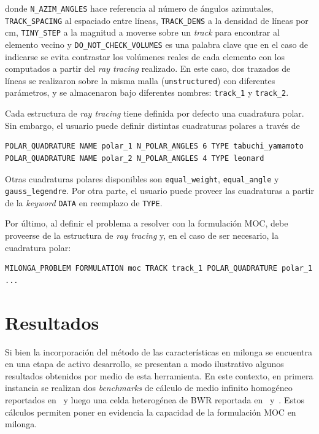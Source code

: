 \documentclass[11pt]{article}
\numberwithin{equation}{section}
\begin{document}
\noindent
donde \texttt{N_AZIM_ANGLES} hace referencia al n\'umero de \'angulos azimutales, \texttt{TRACK_SPACING} al espaciado entre l\'ineas, \texttt{TRACK_DENS} a la densidad de l\'ineas por \si{\centi\metre}, \texttt{TINY_STEP} a la magnitud a moverse sobre un \emph{track} para encontrar al elemento vecino y \texttt{DO_NOT_CHECK_VOLUMES} es una palabra clave que en el caso de indicarse se evita contrastar los volúmenes reales de cada elemento con los computados a partir del \emph{ray tracing} realizado. En este caso, dos trazados de l\'ineas se realizaron sobre la misma malla (\texttt{unstructured}) con diferentes par\'ametros, y se almacenaron bajo diferentes nombres: \texttt{track_1} y \texttt{track_2}.

Cada estructura de \emph{ray tracing} tiene definida por defecto una cuadratura polar. Sin embargo, el usuario puede definir distintas cuadraturas polares a trav\'es de

\begin{lstlisting}[style=wasora]
POLAR_QUADRATURE NAME polar_1 N_POLAR_ANGLES 6 TYPE tabuchi_yamamoto
POLAR_QUADRATURE NAME polar_2 N_POLAR_ANGLES 4 TYPE leonard
\end{lstlisting}

\noindent
Otras cuadraturas polares disponibles son \texttt{equal_weight}, \texttt{equal_angle} y \texttt{gauss_legendre}. Por otra parte, el usuario puede proveer las cuadraturas a partir de la \emph{keyword} \texttt{DATA} en reemplazo de \texttt{TYPE}.

Por \'ultimo, al definir el problema a resolver con la formulación MOC, debe proveerse de la estructura de \emph{ray tracing} y, en el caso de ser necesario, la cuadratura polar:

\begin{lstlisting}[style=wasora]
MILONGA_PROBLEM FORMULATION moc TRACK track_1 POLAR_QUADRATURE polar_1 ...
\end{lstlisting}


\section{Resultados}

Si bien la incorporaci\'on del m\'etodo de las características en milonga se encuentra en una etapa de activo desarrollo, se presentan a modo ilustrativo algunos resultados obtenidos por medio de esta herramienta. En este contexto, en primera instancia se realizan dos \emph{benchmarks} de c\'alculo de medio infinito homog\'eneo reportados en~\cite{sood} y luego una celda heterog\'enea de BWR reportada en~\cite{hong} y~\cite{Mazumdar}. Estos c\'alculos permiten poner en evidencia la capacidad de la formulación MOC en milonga.
\end{document}
